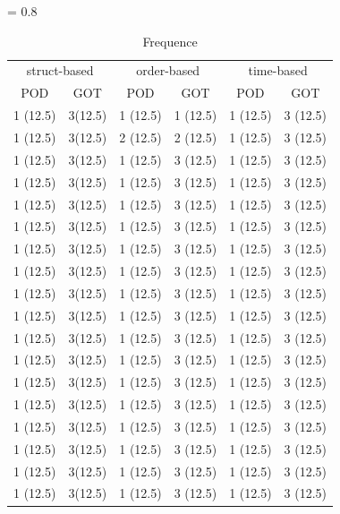 \documentclass[conference]{IEEEtran}
\begin{document}
\begin{table}
 \begin{center}
   \tabcolsep = 0.8\tabcolsep
   \begin{tabular}{|cc|cc|cc|}
      \hline
      \multicolumn{2}{|c|}{struct-based} & \multicolumn{2}{|c|}{order-based} &  \multicolumn{2}{|c|}{time-based} \\
     	 POD & GOT 						& POD & GOT 		& POD & GOT\\
   \hline \hline
     1 (12.5)& 3(12.5)   &  1 (12.5) & 1 (12.5) &  1 (12.5) & 3 (12.5)\\    
     1 (12.5)& 3(12.5)   &  2 (12.5) & 2 (12.5) &  1 (12.5) & 3 (12.5)\\ 
     1 (12.5)& 3(12.5)   &  1 (12.5) & 3 (12.5) &  1 (12.5) & 3 (12.5)\\ 
     1 (12.5)& 3(12.5)   &  1 (12.5) & 3 (12.5) &  1 (12.5) & 3 (12.5)\\    
     1 (12.5)& 3(12.5)   &  1 (12.5) & 3 (12.5) &  1 (12.5) & 3 (12.5)\\ 
     1 (12.5)& 3(12.5)   &  1 (12.5) & 3 (12.5) &  1 (12.5) & 3 (12.5)\\ 
     1 (12.5)& 3(12.5)   &  1 (12.5) & 3 (12.5) &  1 (12.5) & 3 (12.5)\\    
     1 (12.5)& 3(12.5)   &  1 (12.5) & 3 (12.5) &  1 (12.5) & 3 (12.5)\\ 
     1 (12.5)& 3(12.5)   &  1 (12.5) & 3 (12.5) &  1 (12.5) & 3 (12.5)\\  
     1 (12.5)& 3(12.5)   &  1 (12.5) & 3 (12.5) &  1 (12.5) & 3 (12.5)\\    
     1 (12.5)& 3(12.5)   &  1 (12.5) & 3 (12.5) &  1 (12.5) & 3 (12.5)\\ 
     1 (12.5)& 3(12.5)   &  1 (12.5) & 3 (12.5) &  1 (12.5) & 3 (12.5)\\ 
     1 (12.5)& 3(12.5)   &  1 (12.5) & 3 (12.5) &  1 (12.5) & 3 (12.5)\\    
     1 (12.5)& 3(12.5)   &  1 (12.5) & 3 (12.5) &  1 (12.5) & 3 (12.5)\\ 
     1 (12.5)& 3(12.5)   &  1 (12.5) & 3 (12.5) &  1 (12.5) & 3 (12.5)\\ 
     1 (12.5)& 3(12.5)   &  1 (12.5) & 3 (12.5) &  1 (12.5) & 3 (12.5)\\    
     1 (12.5)& 3(12.5)   &  1 (12.5) & 3 (12.5) &  1 (12.5) & 3 (12.5)\\ 
     1 (12.5)& 3(12.5)   &  1 (12.5) & 3 (12.5) &  1 (12.5) & 3 (12.5)\\          
   \hline
   \end{tabular}
\label{tab:table}
 \end{center}
 \caption{Frequence}
\end{table}
\end{document}
